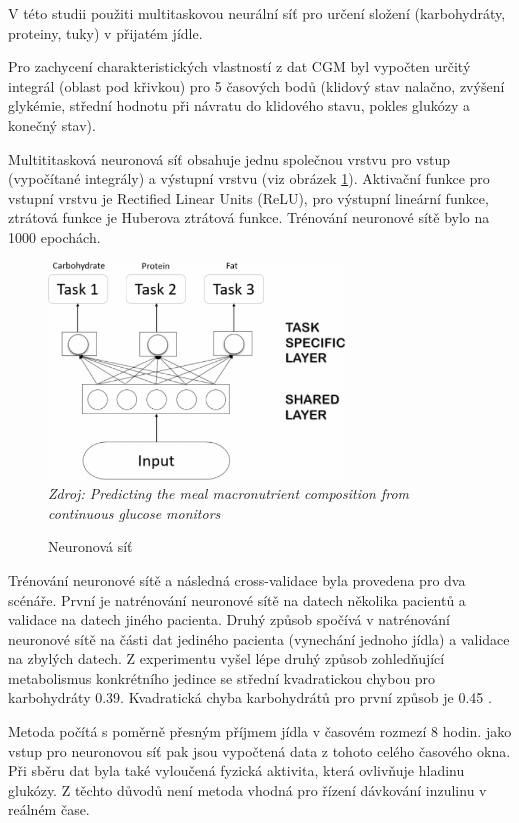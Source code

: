 V této studii \citet{Analyza.Neuronka} použiti multitaskovou neurální síť pro určení složení (karbohydráty, proteiny, tuky) v přijatém jídle.

Pro zachycení charakteristických vlastností z dat CGM byl vypočten určitý integrál (oblast pod křivkou) pro 5 časových bodů (klidový stav nalačno, zvýšení glykémie, střední hodnotu při návratu do klidového stavu, pokles glukózy a konečný stav).

Multititasková neuronová síť obsahuje jednu společnou vrstvu pro vstup (vypočítané integrály) a výstupní vrstvu (viz obrázek \ref{fig:neuronka}). Aktivační funkce pro vstupní vrstvu je Rectified Linear Units (ReLU), pro výstupní lineární funkce, ztrátová funkce je Huberova ztrátová funkce. Trénování neuronové sítě bylo na 1000 epochách.

\begin{figure}[H]
\caption{Neuronová síť}
\label{fig:neuronka}
\centering
\includegraphics[width=0.7\textwidth]{img/analyza/neuronka.png}\\
\textit{Zdroj: Predicting the meal macronutrient composition from continuous glucose monitors \citep{Analyza.Neuronka}}
\end{figure}

Trénování neuronové sítě a následná cross-validace byla provedena pro dva scénáře. První je natrénování neuronové sítě na datech několika pacientů a validace na datech jiného pacienta. Druhý způsob spočívá v natrénování neuronové sítě na části dat jediného pacienta (vynechání jednoho jídla) a validace na zbylých datech. Z experimentu vyšel lépe druhý způsob zohledňující metabolismus konkrétního jedince se střední kvadratickou chybou pro karbohydráty 0.39. Kvadratická chyba karbohydrátů pro první způsob je 0.45 \citep{Analyza.Neuronka}. 

Metoda počítá s poměrně přesným příjmem jídla v časovém rozmezí 8 hodin. jako vstup pro neuronovou síť pak jsou vypočtená data z tohoto celého časového okna. Při sběru dat byla také vyloučená fyzická aktivita, která ovlivňuje hladinu glukózy. Z těchto důvodů není metoda vhodná pro řízení dávkování inzulinu v reálném čase.


